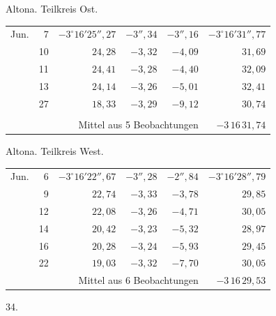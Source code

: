 \noindent\begin{minipage}[t]{.495\textwidth}\centering Altona. Teilkreis Ost.\par\smallskip
{\scriptsize\setlength{\tabcolsep}{1pt}\renewcommand{\arraystretch}{1.2}\begin{tabular}{lr|r|r|r|r|}
Jun.&7&$-3^\circ16'25''{,}27$&$-3''{,}34$&$-3''{,}16$&$-3^\circ16'31''{,}77$\\
&10&$24{,}28$&$-3{,}32$&$-4{,}09$&$31{,}69$\\
&11&$24{,}41$&$-3{,}28$&$-4{,}40$&$32{,}09$\\
&13&$24{,}14$&$-3{,}26$&$-5{,}01$&$32{,}41$\\
&27&$18{,}33$&$-3{,}29$&$-9{,}12$&$30{,}74$\\
&&&&&\\
\cline{6-6}\multicolumn{5}{r}{Mittel aus 5 Beobachtungen}&$-3\,16\,31{,}74$
\end{tabular}}\end{minipage}\hfill\begin{minipage}[t]{.495\textwidth}\centering Altona. Teilkreis West.\par\smallskip
{\scriptsize\setlength{\tabcolsep}{1pt}\renewcommand{\arraystretch}{1.2}\begin{tabular}{lr|r|r|r|r}
Jun.&6&$-3^\circ16'22''{,}67$&$-3''{,}28$&$-2''{,}84$&$-3^\circ16'28''{,}79$\\
&9&$22{,}74$&$-3{,}33$&$-3{,}78$&$29{,}85$\\
&12&$22{,}08$&$-3{,}26$&$-4{,}71$&$30{,}05$\\
&14&$20{,}42$&$-3{,}23$&$-5{,}32$&$28{,}97$\\
&16&$20{,}28$&$-3{,}24$&$-5{,}93$&$29{,}45$\\
&22&$19{,}03$&$-3{,}32$&$-7{,}70$&$30{,}05$\\
\cline{6-6}\multicolumn{5}{r}{Mittel aus 6 Beobachtungen}&$-3\,16\,29{,}53$
\end{tabular}}\end{minipage}
\par\vspace{4mm}
\begin{center}34.\end{center}

